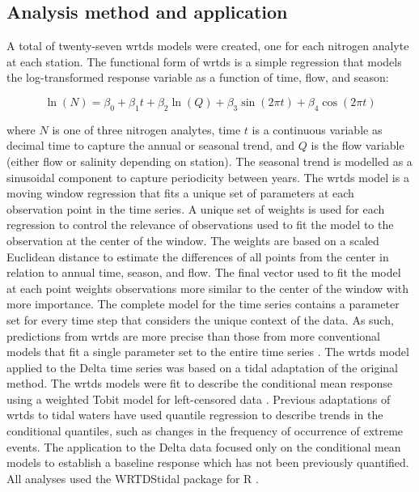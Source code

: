 \documentclass[journal = esthag, manuscript = article]{achemso}\usepackage[]{graphicx}\usepackage[]{color}
\begin{document}
\subsection{Analysis method and application}

A total of twenty-seven \ac{wrtds} models were created, one for each nitrogen analyte at each station.  The functional form of \ac{wrtds} is a simple regression\cite{Hirsch10} that models the log-transformed response variable as a function of time, flow, and season:

\begin{equation}
\ln\left(N\right) = \beta_0 + \beta_1 t + \beta_2 \ln\left(Q\right) + \beta_3 \sin\left(2\pi t\right) + \beta_4 \cos\left(2\pi t\right)
\end{equation}  

\noindent where $N$ is one of three nitrogen analytes, time $t$ is a continuous variable as decimal time to capture the annual or seasonal trend, and $Q$ is the flow variable (either flow or salinity depending on station).  The seasonal trend is modelled as a sinusoidal component to capture periodicity between years.  The \ac{wrtds} model is a moving window regression that fits a unique set of parameters at each observation point in the time series.  A unique set of weights is used for each regression to control the relevance of observations used to fit the model to the observation at the center of the window. The weights are based on a scaled Euclidean distance to estimate the differences of all points from the center in relation to annual time, season, and flow.  The final vector used to fit the model at each point weights observations more similar to the center of the window with more importance.  The complete model for the time series contains a parameter set for every time step that considers the unique context of the data.  As such, predictions from \ac{wrtds} are more precise than those from more conventional models that fit a single parameter set to the entire time series \cite{Moyer12,Beck15}.  The \ac{wrtds} model applied to the Delta time series was based on a tidal adaptation of the original method\cite{Beck15}.  The \ac{wrtds} models were fit to describe the conditional mean response using a weighted Tobit model for left-censored data \cite{Tobin58}.  Previous adaptations of \ac{wrtds} to tidal waters have used quantile regression to describe trends in the conditional quantiles, such as changes in the frequency of occurrence of extreme events.  The application to the Delta data focused only on the conditional mean models to establish a baseline response which has not been previously quantified.  All analyses used the WRTDStidal package for R \cite{Beck16b,RDCT16}.
\end{document}
